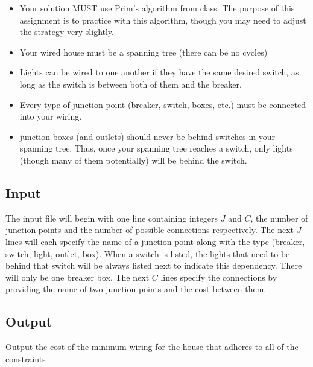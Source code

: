 \documentclass[11pt]{article}
\begin{document}
\begin{itemize}
	\item Your solution MUST use Prim's algorithm from class. The purpose of this assignment is to practice with this algorithm, though you may need to adjust the strategy very slightly.
	\item Your wired house must be a spanning tree (there can be no cycles)
	\item Lights can be wired to one another if they have the same desired switch, as long as the switch is between both of them and the breaker.
	\item Every type of junction point (breaker, switch, boxes, etc.) must be connected into your wiring. 
	\item junction boxes (and outlets) should never be behind switches in your spanning tree. Thus, once your spanning tree reaches a switch, only lights (though many of them potentially) will be behind the switch.
\end{itemize}

\subsection*{Input}
The input file will begin with one line containing integers $J$ and $C$, the number of junction points and the number of possible connections respectively. The next $J$ lines will each specify the name of a junction point along with the type (breaker, switch, light, outlet, box). When a switch is listed, the lights that need to be behind that switch will be always listed next to indicate this dependency. There will only be one breaker box. The next $C$ lines specify the connections by providing the name of two junction points and the cost between them.

\subsection*{Output}

Output the cost of the minimum wiring for the house that adheres to all of the constraints
\end{document}
